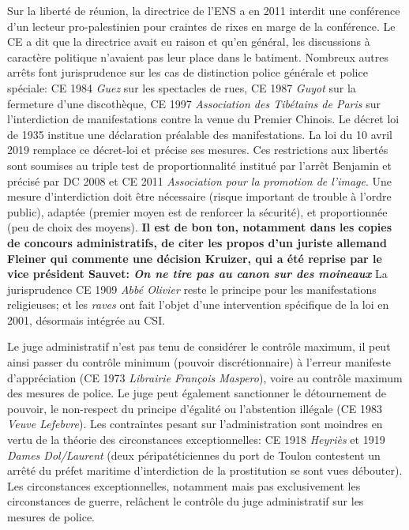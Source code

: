 \documentclass[math]{cours}
\begin{document}
Sur la liberté de réunion, la directrice de l'ENS a en 2011 interdit une conférence d'un lecteur pro-palestinien pour craintes de rixes en marge de la conférence.
Le CE a dit que la directrice avait eu raison et qu'en général, les discussions à caractère politique n'avaient pas leur place dans le batiment.
Nombreux autres arrêts font jurisprudence sur les cas de distinction police générale et police spéciale: CE 1984 \emph{Guez} sur les spectacles de rues, CE 1987 \emph{Guyot} sur la fermeture d'une discothèque, CE 1997 \emph{Association des Tibétains de Paris} sur l'interdiction de manifestations contre la venue du Premier Chinois.
Le décret loi de 1935 institue une déclaration préalable des manifestations.
La loi du 10 avril 2019 remplace ce décret-loi et précise ses mesures.
Ces restrictions aux libertés sont soumises au triple test de proportionnalité institué par l'arrêt Benjamin et précisé par DC 2008 et CE 2011 \emph{Association pour la promotion de l'image}.
Une mesure d'interdiction doit être nécessaire (risque important de trouble à l'ordre public), adaptée (premier moyen est de renforcer la sécurité), et proportionnée (peu de choix des moyens).
\textbf{Il est de bon ton, notamment dans les copies de concours administratifs, de citer les propos d'un juriste allemand Fleiner qui commente une décision Kruizer, qui a été reprise par le vice président Sauvet: \emph{On ne tire pas au canon sur des moineaux}}
La jurisprudence CE 1909 \emph{Abbé Olivier} reste le principe pour les manifestations religieuses; et les \textit{raves} ont fait l'objet d'une intervention spécifique de la loi en 2001, désormais intégrée au CSI.

Le juge administratif n'est pas tenu de considérer le contrôle maximum, il peut ainsi passer du contrôle minimum (pouvoir discrétionnaire) à l'erreur manifeste d'appréciation (CE 1973 \emph{Librairie François Maspero}), voire au contrôle maximum des mesures de police.
Le juge peut également sanctionner le détournement de pouvoir, le non-respect du principe d'égalité ou l'abstention illégale (CE 1983 \emph{Veuve Lefebvre}).
Les contraintes pesant sur l'administration sont moindres en vertu de la théorie des circonstances exceptionnelles: CE 1918 \emph{Heyriès} et 1919 \emph{Dames Dol/Laurent} (deux péripatéticiennes du port de Toulon contestent un arrêté du préfet maritime d'interdiction de la prostitution se sont vues débouter).
Les circonstances exceptionnelles, notamment mais pas exclusivement les circonstances de guerre, relâchent le contrôle du juge administratif sur les mesures de police.
\end{document}
